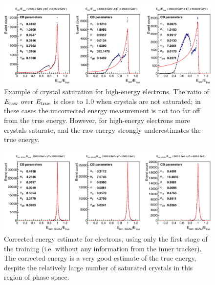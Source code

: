 \begin{figure}[hbtp]
  \begin{center}
    \includegraphics[width=0.99\linewidth]{img/regression/saturation.pdf}
    \caption{
        Example of crystal saturation for high-energy electrons.
        The ratio of $E_\text{raw}$ over $E_\text{true}$ is close to 1.0 when crystals are not saturated; in these cases the uncorrected energy measurement is not too far off from the true energy.
        However, for high-energy electrons more crystals saturate, and the raw energy strongly underestimates the true energy.
        }
    \label{fig:saturation}
  \end{center}
\end{figure}

\begin{figure}[hbtp]
  \begin{center}
    \includegraphics[width=0.99\linewidth]{img/regression/saturation_corrected.pdf}
    \caption{
        Corrected energy estimate for electrons, using only the first stage of the training (i.e. without any information from the inner tracker).
        The corrected energy is a very good estimate of the true energy, despite the relatively large number of saturated crystals in this region of phase space.
        }
    \label{fig:saturation_corrected}
  \end{center}
\end{figure}


